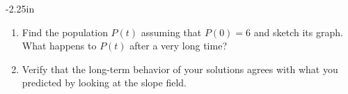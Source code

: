 \begin{adjustwidth*}{}{-2.25in}
\begin{multicols*}{2}
\begin{enumerate}[1)]
    \item Find the population $P(t)$ assuming that $P(0) = 6$ and sketch
      its graph.  What happens to $P(t)$ after a very long time?

    \item Verify that the long-term behavior of your solutions agrees
      with what you predicted by looking at the slope field.

      \ea
\end{enumerate}

\end{multicols*}
\end{adjustwidth*}

\afterexercises
